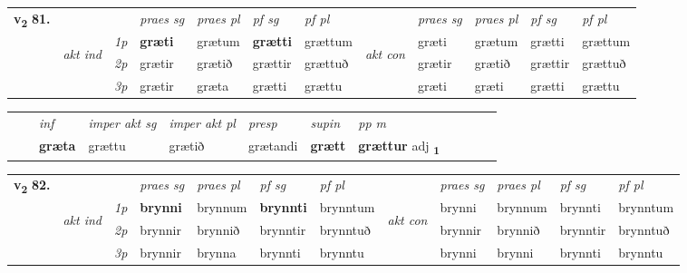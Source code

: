 \begin{tabular}{llllllllllll} \toprule
\multirow{4}{*}{{{\textbf{v{\textsubscript{2}}} \Large{\textbf{81.}}}}}  & &   &  \textit{praes sg}  & \textit{praes pl}  &\textit{ pf sg} & \textit{pf pl} &  &  \textit{praes sg}  & \textit{praes pl}  & \textit{pf sg} & \textit{pf pl } \\*
	\cmidrule{4-7} \cmidrule{9-12}
 & \multirow{3}{*}{\begin{turn}{90}\textit{akt ind}\end{turn}} & {\textit{1p}} & \textbf{græti} & grætum    & \textbf{grætti} & grættum & \multirow{3}{*}{\begin{turn}{90}\textit{akt con}\end{turn}} &græti & grætum & grætti & grættum\\*
& &  {\textit{2p}} &  grætir  & grætið   & grættir & grættuð & & grætir & grætið & grættir & grættuð \\*
& &  {\textit{3p}} & grætir & græta   & grætti & grættu & & græti & græti& grætti & grættu  \\*
\cmidrule{4-7} \cmidrule{9-12}
\end{tabular}


\begin{tabular}{llllllllllll}
 & & \textit{inf} & \textit{imper akt sg} & \textit{imper akt pl}   & \textit{presp} & \textit{supin}  & \textit{pp m}     \\*
  & & \textbf{græta} & grættu  & grætið   & grætandi &  \textbf{grætt}  & \textbf{grættur} adj \textbf{\textsubscript{1}} \\*
\cmidrule{1-12}
\end{tabular}



\begin{tabular}{llllllllllll} \toprule
\multirow{4}{*}{{{\textbf{v{\textsubscript{2}}} \Large{\textbf{82.}}}}}  & &   &  \textit{praes sg}  & \textit{praes pl}  &\textit{ pf sg} & \textit{pf pl} &  &  \textit{praes sg}  & \textit{praes pl}  & \textit{pf sg} & \textit{pf pl } \\*
	\cmidrule{4-7} \cmidrule{9-12}
 & \multirow{3}{*}{\begin{turn}{90}\textit{akt ind}\end{turn}} & {\textit{1p}} & \textbf{brynni} & brynnum    & \textbf{brynnti} & brynntum & \multirow{3}{*}{\begin{turn}{90}\textit{akt con}\end{turn}} &brynni & brynnum & brynnti & brynntum\\*
& &  {\textit{2p}} &  brynnir  & brynnið   & brynntir & brynntuð & & brynnir & brynnið & brynntir & brynntuð \\*
& &  {\textit{3p}} & brynnir & brynna   & brynnti & brynntu & & brynni & brynni& brynnti & brynntu  \\*
\cmidrule{4-7} \cmidrule{9-12}
\end{tabular}


